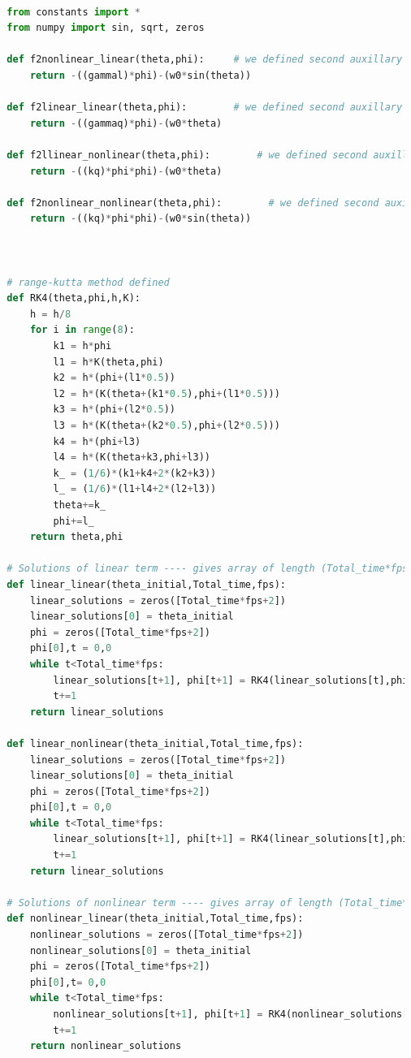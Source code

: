 \documentclass{article}
\begin{document}
\begin{lstlisting}[language=Python]

  from constants import *
  from numpy import sin, sqrt, zeros

  def f2nonlinear_linear(theta,phi):     # we defined second auxillary equation from nonlinear term.
      return -((gammal)*phi)-(w0*sin(theta))

  def f2linear_linear(theta,phi):        # we defined second auxillary equation from linear term.
      return -((gammaq)*phi)-(w0*theta)

  def f2llinear_nonlinear(theta,phi):        # we defined second auxillary equation from linear term.
      return -((kq)*phi*phi)-(w0*theta)

  def f2nonlinear_nonlinear(theta,phi):        # we defined second auxillary equation from linear term.
      return -((kq)*phi*phi)-(w0*sin(theta))



  # range-kutta method defined
  def RK4(theta,phi,h,K): 
      h = h/8
      for i in range(8):
          k1 = h*phi
          l1 = h*K(theta,phi)
          k2 = h*(phi+(l1*0.5))
          l2 = h*(K(theta+(k1*0.5),phi+(l1*0.5)))
          k3 = h*(phi+(l2*0.5))
          l3 = h*(K(theta+(k2*0.5),phi+(l2*0.5)))
          k4 = h*(phi+l3)
          l4 = h*(K(theta+k3,phi+l3))
          k_ = (1/6)*(k1+k4+2*(k2+k3))
          l_ = (1/6)*(l1+l4+2*(l2+l3))
          theta+=k_
          phi+=l_
      return theta,phi

  # Solutions of linear term ---- gives array of length (Total_time*fps)
  def linear_linear(theta_initial,Total_time,fps):
      linear_solutions = zeros([Total_time*fps+2])
      linear_solutions[0] = theta_initial
      phi = zeros([Total_time*fps+2])
      phi[0],t = 0,0
      while t<Total_time*fps:
          linear_solutions[t+1], phi[t+1] = RK4(linear_solutions[t],phi[t],1/fps,f2linear_linear)
          t+=1
      return linear_solutions

  def linear_nonlinear(theta_initial,Total_time,fps):
      linear_solutions = zeros([Total_time*fps+2])
      linear_solutions[0] = theta_initial
      phi = zeros([Total_time*fps+2])
      phi[0],t = 0,0
      while t<Total_time*fps:
          linear_solutions[t+1], phi[t+1] = RK4(linear_solutions[t],phi[t],1/fps,f2llinear_nonlinear)
          t+=1
      return linear_solutions

  # Solutions of nonlinear term ---- gives array of length (Total_time*fps)
  def nonlinear_linear(theta_initial,Total_time,fps):
      nonlinear_solutions = zeros([Total_time*fps+2])
      nonlinear_solutions[0] = theta_initial
      phi = zeros([Total_time*fps+2])
      phi[0],t= 0,0
      while t<Total_time*fps:
          nonlinear_solutions[t+1], phi[t+1] = RK4(nonlinear_solutions[t],phi[t],1/fps,f2nonlinear_linear)
          t+=1
      return nonlinear_solutions


\end{lstlisting}
\end{document}
